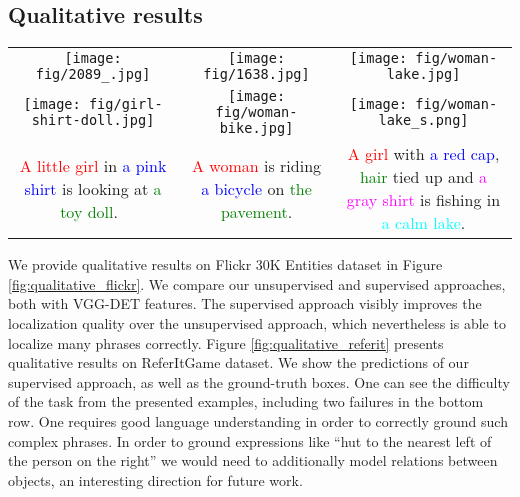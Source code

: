 \subsection{Qualitative results}

\begin{figure*}[t]
\center
\begin{tabular}{c@{\ \ \ \ \ \ }c@{\ \ \ \ }c}
\texttt{[image: fig/2089\_.jpg]} & 
\texttt{[image: fig/1638.jpg]} & 
\texttt{[image: fig/woman-lake.jpg]} \\
\texttt{[image: fig/girl-shirt-doll.jpg]} & 
\texttt{[image: fig/woman-bike.jpg]} & 
\texttt{[image: fig/woman-lake\_s.png]} \\
\multicolumn{1}{m{2.5cm}}{\small{
\textcolor{red}{A little girl} in \textcolor{blue}{a pink shirt} is looking at \textcolor{green}{a toy doll}.\newline ~
}} &
\multicolumn{1}{m{3.5cm}}{\small{
\textcolor{red}{A woman} is riding \textcolor{blue}{a bicycle} on \textcolor{green}{the pavement}.\newline
}} & 
\multicolumn{1}{m{3.7cm}}{\small{
\textcolor{red}{A girl} with \textcolor{blue}{a red cap}, \textcolor{green}{hair} tied up and \textcolor{magenta}{a gray shirt} is fishing in \textcolor{cyan}{a calm lake}.
}} 
\end{tabular}
\caption{Qualitative results on the test set of Flickr 30k Entities. Top : GroundeR (VGG-DET) unsupervised, bottom: GroundeR (VGG-DET) supervised.}
\label{fig:qualitative_flickr}
\end{figure*}

We provide qualitative results on Flickr 30K Entities dataset in Figure \ref{fig:qualitative_flickr}. We compare our unsupervised and supervised approaches, both with VGG-DET features. The supervised approach visibly improves the localization quality over the unsupervised approach, which nevertheless is able to localize many phrases correctly.
Figure \ref{fig:qualitative_referit} presents qualitative results on ReferItGame dataset. We show the predictions of our supervised approach, as well as the ground-truth boxes. One can see the difficulty of the task from the presented examples, including two failures in the bottom row. One requires good language understanding in order to correctly ground such complex phrases. In order to ground expressions like ``hut to the nearest left of the person on the right'' we would need to additionally model relations between objects, an interesting direction for future work.

